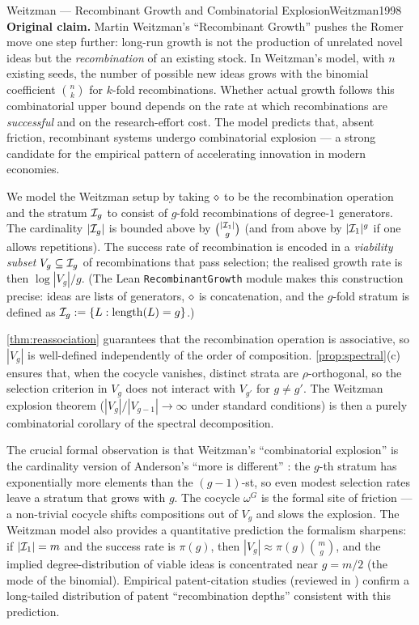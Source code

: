 \begin{zooentry}{Weitzman --- Recombinant Growth and Combinatorial Explosion}{Weitzman1998}
\textbf{Original claim.} Martin Weitzman's ``Recombinant Growth''
\cite{Weitzman1998} pushes the Romer move one step further: long-run
growth is not the production of unrelated novel ideas but the
\emph{recombination} of an existing stock. In Weitzman's model, with
$n$ existing seeds, the number of possible new ideas grows with the
binomial coefficient $\binom{n}{k}$ for $k$-fold recombinations.
Whether actual growth follows this combinatorial upper bound depends
on the rate at which recombinations are \emph{successful} and on the
research-effort cost. The model predicts that, absent friction,
recombinant systems undergo combinatorial explosion --- a strong
candidate for the empirical pattern of accelerating innovation in
modern economies.

\formalclaim We model the Weitzman setup by taking $\mathbin{\diamond}$ to be
the recombination operation and the stratum $\mathcal{I}_g$ to consist of
$g$-fold recombinations of degree-$1$ generators. The cardinality
$|\mathcal{I}_g|$ is bounded above by $\binom{|\mathcal{I}_1|}{g}$ (and from
above by $|\mathcal{I}_1|^g$ if one allows repetitions). The success rate
of recombination is encoded in a \emph{viability subset}
$V_g\subseteq \mathcal{I}_g$ of recombinations that pass selection; the
realised growth rate is then $\log|V_g| / g$. (The Lean
\texttt{RecombinantGrowth} module makes this construction precise:
ideas are lists of generators, $\mathbin{\diamond}$ is concatenation, and the
$g$-fold stratum is defined as
$\mathcal{I}_g \mathrel{:=} \{L : \mathrm{length}(L) = g\}$.)

\formalstatus \cref{thm:reassociation} guarantees that the recombination
operation is associative, so $|V_g|$ is well-defined independently of
the order of composition. \cref{prop:spectral}(c) ensures that, when
the cocycle vanishes, distinct strata are $\rho$-orthogonal, so the
selection criterion in $V_g$ does not interact with $V_{g'}$ for
$g\neq g'$. The Weitzman explosion theorem
($|V_g|/|V_{g-1}|\to\infty$ under standard conditions) is then a
purely combinatorial corollary of the spectral decomposition.

\litcomment The crucial formal observation is that Weitzman's
``combinatorial explosion'' is the cardinality version of Anderson's
``more is different'' \cite{Anderson1972}: the $g$-th stratum has
exponentially more elements than the $(g-1)$-st, so even modest
selection rates leave a stratum that grows with $g$. The cocycle
$\omega^G$ is the formal site of friction --- a non-trivial cocycle
shifts compositions out of $V_g$ and slows the explosion. The
Weitzman model also provides a quantitative prediction the formalism
sharpens: if $|\mathcal{I}_1| = m$ and the success rate is $\pi(g)$, then
$|V_g| \approx \pi(g)\binom{m}{g}$, and the implied
degree-distribution of viable ideas is concentrated near $g = m/2$
(the mode of the binomial). Empirical patent-citation studies
(reviewed in \cite{Weitzman1998}) confirm a long-tailed distribution
of patent ``recombination depths'' consistent with this prediction.
\end{zooentry}


